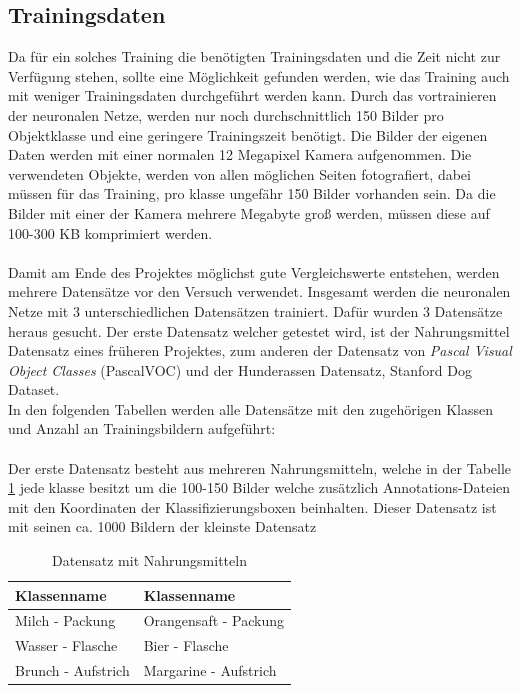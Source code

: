 \documentclass[a4paper,12pt,oneside]{article}
\begin{document}
  \subsection{Trainingsdaten}\label{s.tdaten}
Da für ein solches Training die benötigten Trainingsdaten und die Zeit nicht zur Verfügung stehen, sollte eine Möglichkeit gefunden werden, wie das Training auch mit weniger Trainingsdaten durchgeführt werden kann. Durch das vortrainieren der neuronalen Netze, werden nur noch durchschnittlich 150 Bilder pro Objektklasse und eine geringere Trainingszeit benötigt. Die Bilder der eigenen Daten werden mit einer normalen 12 Megapixel Kamera aufgenommen. Die verwendeten Objekte, werden von allen möglichen Seiten fotografiert, dabei müssen für das Training, pro klasse ungefähr 150 Bilder vorhanden sein. Da die Bilder mit einer der Kamera mehrere Megabyte groß werden, müssen diese auf 100-300 KB komprimiert werden.\\\\
Damit am Ende des Projektes möglichst gute Vergleichswerte entstehen, werden mehrere Datensätze vor den Versuch verwendet. Insgesamt werden die neuronalen Netze mit 3 unterschiedlichen Datensätzen trainiert. Dafür wurden 3 Datensätze heraus gesucht. Der erste Datensatz welcher getestet wird, ist der Nahrungsmittel Datensatz eines früheren Projektes, zum anderen der Datensatz von \textit{Pascal Visual Object Classes} (PascalVOC) und der Hunderassen Datensatz, Stanford Dog Dataset.\\
In den folgenden Tabellen werden alle Datensätze mit den zugehörigen Klassen und Anzahl an Trainingsbildern aufgeführt:\\\\
Der erste Datensatz besteht aus mehreren Nahrungsmitteln, welche in der Tabelle \ref{tab:nahrungsmittel} jede klasse besitzt um die 100-150 Bilder welche zusätzlich Annotations-Dateien mit den Koordinaten der Klassifizierungsboxen beinhalten. Dieser Datensatz ist mit seinen ca. 1000 Bildern der kleinste Datensatz 
\begin{table}
[h]
\caption{Datensatz mit Nahrungsmitteln}
\centering
\begin{tabular}{|l|l|}
\hline
Klassenname & Klassenname\\
\hline
Milch - Packung & Orangensaft - Packung\\
Wasser - Flasche & Bier - Flasche\\
Brunch - Aufstrich & Margarine - Aufstrich\\
\hline
\end{tabular}
\label{tab:nahrungsmittel}
\end{table}\\
\end{document}
